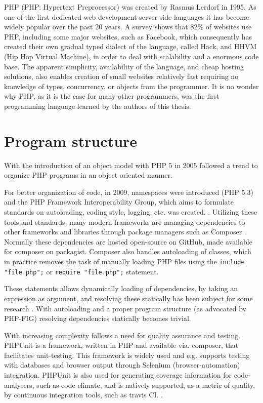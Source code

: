 PHP (PHP: Hypertext Preprocessor) was created by Rasmus Lerdorf in 1995. As one of the first dedicated web development server-side languages it has become widely popular over the past 20 years. A survey shows that 82\% of websites use PHP, including some major websites, such as Facebook, which consequently has created their own gradual typed dialect of the language, called Hack, and HHVM (Hip Hop Virtual Machine), in order to deal with scalability and a enormous code base. The apparent simplicity, availability of the language, and cheap hosting solutions,  also enables creation of small websites relatively fast requiring no knowledge of types, concurrency, or objects from the programmer. It is no wonder why PHP, as it is the case for many other programmers, was the first programming language learned by the authors of this thesis.

\section{Program structure}
With the introduction of an object model with PHP 5 in 2005 followed a trend to organize PHP programs in an object oriented manner. 

For better organization of code, in 2009, namespaces were introduced (PHP 5.3) and the PHP Framework Interoperability Group, which aims to formulate standards on autoloading, coding style, logging, etc. was created. . Utilizing these tools and standards, many modern frameworks are managing dependencies to other frameworks and libraries through package managers such as Composer . Normally these dependencies are hosted open-source on GitHub, made available for composer on packagist. Composer also handles autoloading of classes, which in practice removes the task of manually loading PHP files using the \texttt{include "file.php";} or \texttt{require "file.php";} statement. 

These statements allows dynamically loading of dependencies, by taking an expression as argument, and resolving these statically has been subject for some research . With autoloading and a proper program structure (as advocated by PHP-FIG) resolving dependencies statically becomes trivial.

With increasing complexity follows a need for quality assurance and testing. PHPUnit is a framework, written in PHP and available via. composer, that facilitates unit-testing. This framework is widely used and e.g. supports testing with databases and browser output through Selenium (browser-automation) integration. PHPUnit is also used for generating coverage information for code-analysers, such as code climate, and is natively supported, as a metric of quality, by continuous integration tools, such as travis CI. . 

